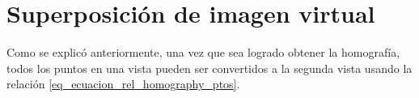 \documentclass[a4paper,11pt,spanish]{article}
\begin{document}

\section {Superposición de imagen virtual}
Como se explicó anteriormente, una vez que sea logrado obtener la homografía, todos los puntos en una vista pueden ser convertidos a la segunda vista usando la relación \eqref{eq_ecuacion_rel_homography_ptos}.

\end{document}

